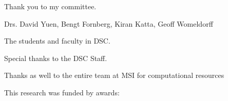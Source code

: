 \begin{acknowledgments}

Thank you to my committee. 

Drs. David Yuen, Bengt Fornberg, Kiran Katta, Geoff Womeldorff

The students and faculty in DSC. 

Special thanks to the DSC Staff. 

Thanks as well to the entire team at MSI for computational resources 

This research was funded by awards: 




\end{acknowledgments}
